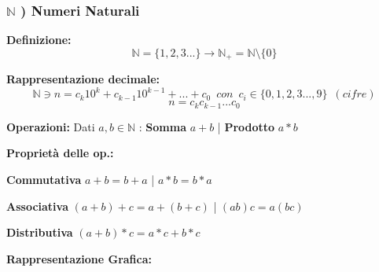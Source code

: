 \documentclass[10pt]{article}
\theoremstyle{plain}
\begin{document}
    \subsubsection*{$\mathbb{N}$ ) Numeri Naturali}
        \begin{description}
            \item \textbf{Definizione: } \[\mathbb{N} = \{1,2,3...\} \longrightarrow \mathbb{N}_+ = \mathbb{N} \setminus \{0\}\]
            \item \textbf{Rappresentazione decimale: }  \[\mathbb{N} \owns n = c_k 10^k + c_{k-1} 10^{k-1} + ... + c_0 \enspace{} {con} \enspace{} c_i \in \{0,1,2,3...,9\}\enspace{} {(cifre)}\]
            \[n = c_k c_{k-1} ... c_0\]
            \item \textbf{Operazioni: } Dati $a, b \in \mathbb{N}$ : \textbf{Somma} $a + b$ | \textbf{Prodotto} $a*b$
            \item \textbf{Proprietà delle op.:}
                \begin{description}
                    \item \textbf{Commutativa} $a + b = b + a$ | $a*b = b*a$
                    \item \textbf{Associativa} $(a + b) + c = a + (b + c)$ | $(a b) c = a (b c)$
                    \item \textbf{Distributiva} $(a + b)*c = a*c + b*c$
                \end{description}
            \item \textbf{Rappresentazione Grafica: }
            \item
            \item 
\end{description}
\end{document}
